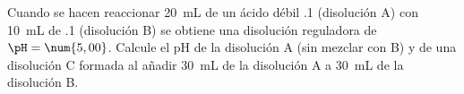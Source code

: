 Cuando se hacen reaccionar \SI{20}{\milli\liter} de un ácido débil  \SI{,1}{\Molar} (disolución A) con \SI{10}{\milli\liter} de  \SI{,1}{\Molar} (disolución B) se obtiene una disolución reguladora de $\pH = \num{5,00}$. Calcule el pH de la disolución A (sin mezclar con B) y de una disolución C formada al añadir \SI{30}{\milli\liter} de la disolución A a \SI{30}{\milli\liter} de la disolución B.


